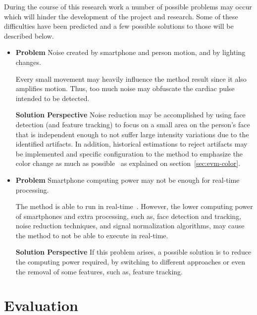 
During the course of this research work a number of possible problems may
occur which will hinder the development of the project and research. Some
of these difficulties have been predicted and a few possible solutions to 
those will be described below.

\begin{itemize}

\item
\textbf{Problem}
Noise created by smartphone and person motion, and by lighting changes.

Every small movement may heavily influence the method result since it
also amplifies motion. Thus, too much noise may obfuscate the cardiac 
pulse intended to be detected.

\textbf{Solution Perspective}
Noise reduction may be accomplished by using face detection (and feature 
tracking) to focus on a small area on the person's face that is independent
enough to not suffer large intensity variations due to the identified 
artifacts. In addition, historical estimations to reject artifacts may be
implemented and specific configuration to the \evm{} method to 
emphasize the color change as much as possible~\cite{Wu2012Eulerian} as
explained on section~\ref{sec:evm-color}.

\pagebreak

\item
\textbf{Problem}
Smartphone computing power may not be enough for real-time processing.

The \evm{} method is able to run in real-time~\cite{Wu2012Eulerian}. However, 
the lower computing power of smartphones and extra processing, such as, 
face detection and tracking, noise reduction techniques, and signal 
normalization algorithms, may cause the method to not be able to execute 
in real-time.

\textbf{Solution Perspective}
If this problem arises, a possible solution is to reduce the computing power
required, by switching to different approaches or even the removal of 
some features, such as, feature tracking.

\end{itemize}

\section{Evaluation} \label{sec:evaluation}


